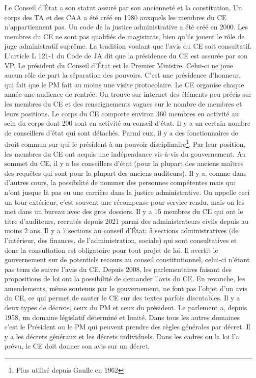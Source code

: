 \documentclass[math]{cours}
\begin{document}
Le Conseil d'État a son statut assuré par son ancienneté et la constitution,
Un corps des TA et des CAA a été créé en 1980 auxquels les membres du CE n'appartiennent pas.
Un code de la justice administrative a été créé en 2000.
Les membres du CE ne sont pas qualifiés de magistrats, bien qu'ils jouent le rôle de juge administratif suprême.
La tradition voulant que l'avis du CE soit consultatif.
L'article L 121-1 du Code de JA dit que la présidence du CE est assurée par son VP.
Le président du Conseil d'État est le Premier Ministre. Celui-ci ne joue aucun rôle de part la séparation des pouvoirs.
C'est une présidence d'honneur, qui fait que le PM fait au moins une visite protocolaire.
Le CE organise chaque année une audience de rentrée.
On trouve sur internet des éléments peu précis sur les membres du CE et des renseignements vagues sur le nombre de membres et leurs positions.
Le corps du CE comporte environ 360 membres en activité au sein du corps dont 200 sont en activité au conseil d'état.
Il y a un certain nombre de conseillers d'état qui sont détachés.
Parmi eux, il y a des fonctionnaires de droit commun sur qui le président à un pouvoir disciplinaire\footnote{Plus utilisé depuis Gaulle en 1962}.
Par leur position, les membres du CE ont acquis une indépendance vis-à-vis du gouvernement.
Au sommet du CE, il y a les conseillers d'état (pour la plupart des anciens maîtres des requêtes qui sont pour la plupart des anciens auditeurs).
Il y a, comme dans d'autres cours, la possibilité de nommer des personnes compétentes mais qui n'ont jusque là pas eu une carrière dans la justice administrative.
On appelle ceci un tour extérieur, c'est souvent une récompense pour service rendu, mais on les met dans un bureau avec des gros dossiers.
Il y a 15 membres du CE qui ont le titre d'auditeurs, recrutés depuis 2021 parmi des administrateurs civils depuis au moins 2 ans.
Il y a 7 sections au conseil d'État: 5 sections administratives (de l'intérieur, des finances, de l'administration, sociale) qui sont consultatives et donc la consultation est obligatoire pour tout projet de loi.
Il avertit le gouvernement sur de potentiels recours au conseil constitutionnel, celui-ci n'étant pas tenu de suivre l'avis du CE.
Depuis 2008, les parlementaires faisant des propositions de loi ont la possibilité de demander l'avis du CE.
En revanche, les amendements, même soutenus par le gouvernement, ne font pas l'objet d'un avis du CE, ce qui permet de sauter le CE sur des textes parfois discutables.
Il y a deux types de décrets, ceux du PM et ceux du président.
Le parlement a, depuis 1958, un domaine législatif déterminé et limité. Dans tous les autres domaines c'est le Président ou le PM qui peuvent prendre des règles générales par décret.
Il y a les décrets généraux et les décrets individuels.
Dans les cadres ou la loi l'a prévu, le CE doit donner son avis sur un décret.
\end{document}
